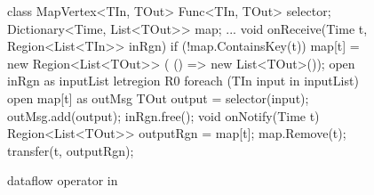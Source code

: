 \begin{figure}[t!]
\begin{numcodejava}
class MapVertex<TIn, TOut> {
  Func<TIn, TOut> selector;
  Dictionary<Time, List<TOut>> map;
  ...
  void onReceive(Time t, Region<List<TIn>> inRgn) {
    if (!map.ContainsKey(t))
       map[t] = new Region<List<TOut>> (
                  () => new List<TOut>());
    open inRgn as inputList {
      letregion R0 {
        foreach (TIn input in inputList) {
          open map[t] as outMsg {
            TOut output = selector(input);
            outMsg.add(output);
          }
        }
      }
    }
    inRgn.free();
  }
  void onNotify(Time t) {
     Region<List<TOut>> outputRgn = map[t];
     map.Remove(t);
     transfer(t, outputRgn); 
  }
}
\end{numcodejava}
\caption{ dataflow operator in \name}
\label{fig:motivating-eg-in-broom}
\end{figure}

